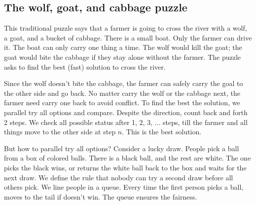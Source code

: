 \documentclass[b5paper]{article}
\begin{document}
\begin{Exercise}[label={ex:leap-frog}]
\end{Exercise}

\begin{Answer}[ref = {ex:leap-frog}]
\end{Answer}

\subsection{The wolf, goat, and cabbage puzzle}

This traditional puzzle says that a farmer is going to cross the river with a wolf, a goat, and a bucket of cabbage. There is a small boat. Only the farmer can drive it. The boat can only carry one thing a time. The wolf would kill the goat; the goat would bite the cabbage if they stay alone without the farmer. The puzzle asks to find the best (fast) solution to cross the river.

Since the wolf doesn't bite the cabbage, the farmer can safely carry the goal to the other side and go back. No matter carry the wolf or the cabbage next, the farmer need carry one back to avoid conflict. To find the best the solution, we parallel try all options and compare. Despite the direction, count back and forth 2 steps. We check all possible status after 1, 2, 3, ... steps, till the farmer and all things move to the other side at step $n$. This is the best solution.

But how to parallel try all options? Consider a lucky draw. People pick a ball from a box of colored balls. There is a black ball, and the rest are white. The one picks the black wins, or returns the white ball back to the box and waits for the next draw. We define the rule that nobody can try a second draw before all others pick. We line people in a queue. Every time the first person picks a ball, moves to the tail if doesn't win. The queue ensures the fairness.
\end{document}

